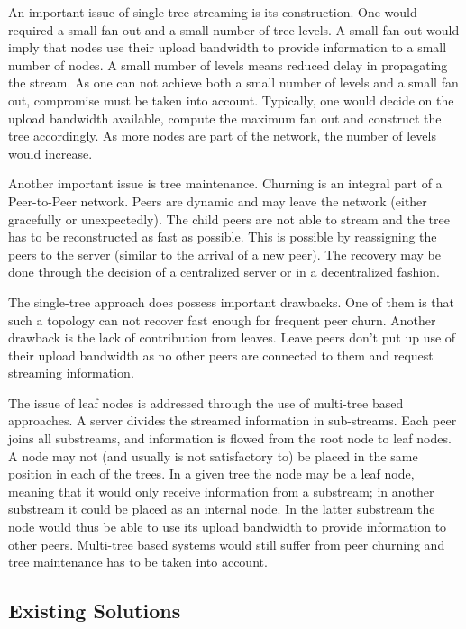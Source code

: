 An important issue of single-tree streaming is its construction. One would
required a small fan out and a small number of tree levels. A small fan out
would imply that nodes use their upload bandwidth to provide information to a
small number of nodes. A small number of levels means reduced delay in
propagating the stream. As one can not achieve both a small number of
levels and a small fan out, compromise must be taken into account. Typically,
one would decide on the upload bandwidth available, compute the maximum fan
out and construct the tree accordingly. As more nodes are part of the network,
the number of levels would increase.

Another important issue is tree maintenance. Churning is an integral part of
a Peer-to-Peer network. Peers are dynamic and may leave the network (either
gracefully or unexpectedly). The child peers are not able to stream and the
tree has to be reconstructed as fast as possible. This is possible by
reassigning the peers to the server (similar to the arrival of a new peer).
The recovery may be done through the decision of a centralized server or in a
decentralized fashion.

The single-tree approach does possess important drawbacks. One of them is that
such a topology can not recover fast enough for frequent peer churn. Another
drawback is the lack of contribution from leaves. Leave peers don't put up use
of their upload bandwidth as no other peers are connected to them and request
streaming information.

The issue of leaf nodes is addressed through the use of multi-tree based
approaches. A server divides the streamed information in sub-streams. Each
peer joins all substreams, and information is flowed from the root node to
leaf nodes. A node may not (and usually is not satisfactory to) be placed in the
same position in each of the trees. In a given tree the node may be a leaf
node, meaning that it would only receive information from a substream; in
another substream it could be placed as an internal node. In the latter
substream the node would thus be able to use its upload bandwidth to provide
information to other peers. Multi-tree based systems would still suffer from
peer churning and tree maintenance has to be taken into account.

\subsection{Existing Solutions}
\label{subsec:p2p-systems:solutions}

